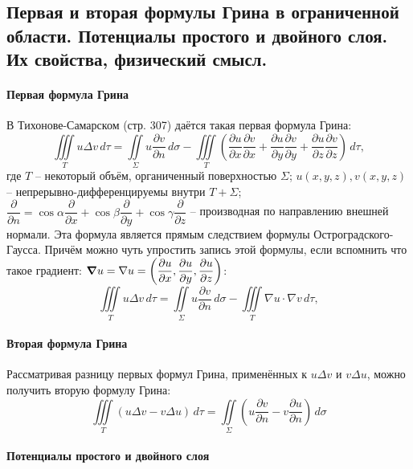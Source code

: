 \subsection{Первая и вторая формулы Грина в ограниченной области. Потенциалы простого и
двойного слоя. Их свойства, физический смысл.}

\paragraph{Первая формула Грина}

В Тихонове-Самарском (стр. 307) даётся такая первая формула Грина:
\begin{equation} \label{first_green_formula}
	\iiint \limits_T u \Delta v \, d\tau
	= \iint \limits_\Sigma u \dfrac{\partial v}{\partial n} \, d\sigma
	- \iiint \limits_T \left(
	\dfrac{\partial u}{\partial x} \dfrac{\partial v}{\partial x} + 
	\dfrac{\partial u}{\partial y} \dfrac{\partial v}{\partial y} + 
	\dfrac{\partial u}{\partial z} \dfrac{\partial v}{\partial z} \right) \, d\tau,
\end{equation}
где $T$ -- некоторый объём, органиченный поверхностью $\Sigma$;
$u(x, y, z), v(x, y, z)$ -- непрерывно-дифференцируемы внутри $T+\Sigma$;
$\dfrac{\partial}{\partial n} = \cos\alpha \dfrac{\partial}{\partial x} 
  + \cos\beta \dfrac{\partial}{\partial y} 
  + \cos\gamma \dfrac{\partial}{\partial z}$ -- производная по направлению внешней нормали.
Эта формула является прямым следствием формулы Остроградского-Гаусса. Причём можно чуть упростить
запись этой формулы, если вспомнить что такое градиент:
$\grad u = \nabla u = \left( \dfrac{\partial u}{\partial x}, 
  \dfrac{\partial u}{\partial y},
  \dfrac{\partial u}{\partial z} \right) $:
\[
  \iiint \limits_T u \Delta v \, d\tau
  = \iint \limits_\Sigma u \dfrac{\partial v}{\partial n} \, d\sigma
    - \iiint \limits_T \nabla u \cdot \nabla v \, d\tau,
\]

\paragraph{Вторая формула Грина}

Рассматривая разницу первых формул Грина, применённых к $u \Delta v$ и $v \Delta u$, можно
получить вторую формулу Грина:
\[
  \iiint \limits_T \left( u \Delta v - v \Delta u \right) \, d\tau
  = \iint \limits_\Sigma \left( u \dfrac{\partial v}{\partial n} - v \dfrac{\partial u}{\partial n}  \right) \, d\sigma
\]

\paragraph{Потенциалы простого и двойного слоя}

